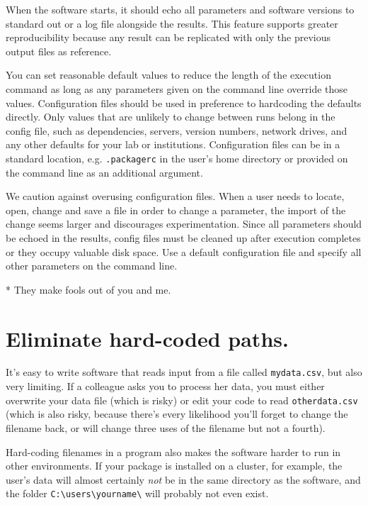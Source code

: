 \documentclass[10pt]{article}
\begin{document}
When the software starts, it should echo all parameters and software
versions to standard out or a log file alongside the results. This
feature supports greater reproducibility because any result can be
replicated with only the previous output files as reference.

You can set reasonable default values to reduce the length of the
execution command as long as any parameters given on the command line
override those values. Configuration files should be used in preference
to hardcoding the defaults directly. Only values that are unlikely to
change between runs belong in the config file, such as dependencies,
servers, version numbers, network drives, and any other defaults for
your lab or institutions. Configuration files can be in a standard
location, e.g. \texttt{.packagerc} in the user's home directory or
provided on the command line as an additional argument.

We caution against overusing configuration files. When a user needs to
locate, open, change and save a file in order to change a parameter, the
import of the change seems larger and discourages experimentation. Since
all parameters should be echoed in the results, config files must be
cleaned up after execution completes or they occupy valuable disk space.
Use a default configuration file and specify all other parameters on the
command line.

* They make fools out of you and me.

\section{Eliminate hard-coded paths.}

It's easy to write software that reads input from a file called
\texttt{mydata.csv}, but also very limiting. If a colleague asks you to
process her data, you must either overwrite your data file (which is
risky) or edit your code to read \texttt{otherdata.csv} (which is also
risky, because there's every likelihood you'll forget to change the
filename back, or will change three uses of the filename but not a
fourth).

Hard-coding filenames in a program also makes the software harder to run
in other environments. If your package is installed on a cluster, for
example, the user's data will almost certainly \emph{not} be in the same
directory as the software, and the folder
\texttt{C:\textbackslash{}users\textbackslash{}yourname\textbackslash{}}
will probably not even exist.
\end{document}
